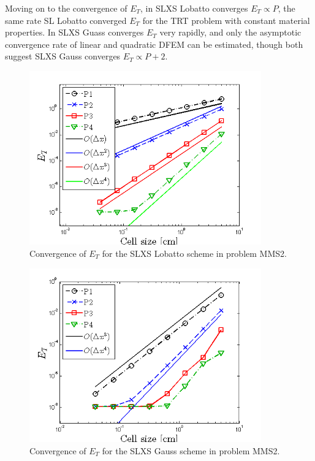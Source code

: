 Moving on to the convergence of $E_T$, in  SLXS Lobatto converges $E_T \propto P$, the same rate SL Lobatto converged $E_T$ for the TRT problem with constant material properties.  
In  SLXS Guass converges $E_T$ very rapidly, and only the asymptotic convergence rate of linear and quadratic DFEM can be estimated, though both suggest SLXS Gauss converges $E_T \propto P+2$.
\begin{figure}[!hbp]
\centering
\includegraphics[width=10cm]{chapter6_grey_radtran/Dissertation_Data/MMS3_SLXS_Initial_SLXS_Lobatto_temp_L2.png}
\caption{Convergence of $E_{T}$ for the SLXS Lobatto scheme in problem MMS2.}
\label{fig:mms3_slxs_lobatto_e_t}
\end{figure}
\newpage
%
%
\begin{figure}[!htp]
\centering
\includegraphics[width=10cm]{chapter6_grey_radtran/Dissertation_Data/MMS3_SLXS_Initial_SLXS_Gauss_temp_L2.png}
\caption{Convergence of $E_{T}$ for the SLXS Gauss scheme in problem MMS2.}
\label{fig:mms3_slxs_gauss_e_t}
\end{figure}
%
